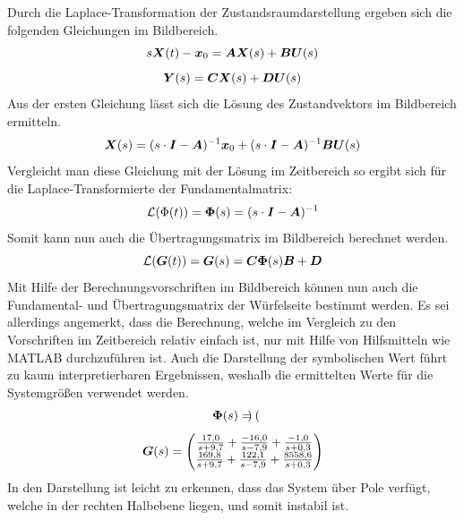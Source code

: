 Durch die Laplace-Transformation der Zustandsraumdarstellung ergeben sich die folgenden Gleichungen im Bildbereich.
\begin{equation}
s\boldsymbol{X}(t) - \boldsymbol{x}_0 = \boldsymbol{A}\boldsymbol{X}(s) + \boldsymbol{B}\boldsymbol{U}(s)
\end{equation}
\begin{equation}
\boldsymbol{Y}(s) = \boldsymbol{C}\boldsymbol{X}(s)+\boldsymbol{D}\boldsymbol{U}(s)
\end{equation}
Aus der ersten Gleichung lässt sich die Lösung des Zustandvektors im Bildbereich ermitteln.
\begin{equation}
\boldsymbol{X}(s) = (s\cdot \boldsymbol{I} - \boldsymbol{A})^{-1}\boldsymbol{x}_0 + (s\cdot\boldsymbol{I}-\boldsymbol{A})^{-1}\boldsymbol{B}\boldsymbol{U}(s)
\end{equation}
Vergleicht man diese Gleichung mit der Lösung im Zeitbereich so ergibt sich für die Laplace-Transformierte der Fundamentalmatrix:
\begin{equation}
\mathcal{L}(\Phi(t)) = \boldsymbol{\Phi}(s) = (s\cdot\boldsymbol{I}-\boldsymbol{A})^{-1}
\end{equation}
Somit kann nun auch die Übertragungsmatrix im Bildbereich berechnet werden.
\begin{equation}
\mathcal{L}(\boldsymbol{G}(t)) = \boldsymbol{G}(s) = \boldsymbol{C}\boldsymbol{\Phi}(s)\boldsymbol{B}+\boldsymbol{D}
\end{equation}
Mit Hilfe der Berechnungsvorschriften im Bildbereich können nun auch die Fundamental- und Übertragungsmatrix der Würfelseite bestimmt werden. Es sei allerdings angemerkt, dass die Berechnung, welche im Vergleich zu den Vorschriften im Zeitbereich relativ einfach ist, nur mit Hilfe von Hilfsmitteln wie MATLAB durchzuführen ist. Auch die Darstellung der symbolischen Wert führt zu kaum interpretierbaren Ergebnissen, weshalb die ermittelten Werte für die Systemgrößen verwendet werden.
\begin{equation}
\boldsymbol{\Phi}(s) = \begin{pmatrix}

\end{pmatrix}
\end{equation}
\begin{equation}
\boldsymbol{G}(s)= \begin{pmatrix}
\frac{17,0}{s+9,7}+\frac{-16,0}{s-7,9}+\frac{-1,0}{s+0,3} \\
\frac{169,8}{s+9,7}+\frac{122,1}{s-7,9}+\frac{8558,6}{s+0,3}
\end{pmatrix}
\end{equation}
In den Darstellung ist leicht zu erkennen, dass das System über Pole verfügt, welche in der rechten Halbebene liegen, und somit instabil ist. 